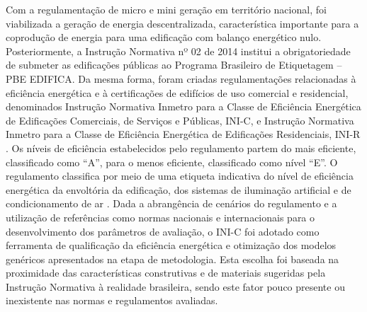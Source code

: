 \begin{onehalfspace}
Com a regulamentação de micro e mini geração em território nacional, foi viabilizada a geração de 
energia descentralizada, característica importante para a coprodução de energia para uma edificação 
com balanço energético nulo.\vspace{0.3cm} \newline
Posteriormente, a Instrução Normativa nº 02 de 2014 institui a obrigatoriedade de submeter as edificações 
públicas ao Programa Brasileiro de Etiquetagem – PBE EDIFICA. Da mesma forma, foram criadas regulamentações 
relacionadas à eficiência energética e à certificações de edifícios de uso comercial e residencial, 
denominados Instrução Normativa Inmetro para a Classe de Eficiência Energética de Edificações Comerciais, 
de Serviços e Públicas, INI-C, e Instrução Normativa Inmetro para a Classe de Eficiência Energética 
de Edificações Residenciais, INI-R \cite{Dalbem2017,InstitutoNacionaldeMetrologiaNormalizacaoeQualidadeIndustrial-INMETRO2018}.\vspace{0.3cm} \newline
Os níveis de eficiência estabelecidos pelo regulamento partem do mais eficiente, classificado como 
“A”, para o menos eficiente, classificado como nível “E”. O regulamento classifica por meio de uma 
etiqueta indicativa do nível de eficiência energética da envoltória da edificação, dos sistemas de 
iluminação artificial e de condicionamento de ar \cite{InstitutoNacionaldeMetrologiaNormalizacaoeQualidadeIndustrial-INMETRO2018a}.\vspace{0.3cm} \newline
Dada a abrangência de cenários do regulamento e a utilização de referências como normas nacionais 
e internacionais para o desenvolvimento dos parâmetros de avaliação, o INI-C foi adotado como 
ferramenta de qualificação da eficiência energética e otimização dos modelos genéricos apresentados 
na etapa de metodologia. Esta escolha foi baseada na proximidade das características construtivas 
e de materiais sugeridas pela Instrução Normativa à realidade brasileira, sendo este fator pouco 
presente ou inexistente nas normas e regulamentos avaliadas.
\end{onehalfspace}
